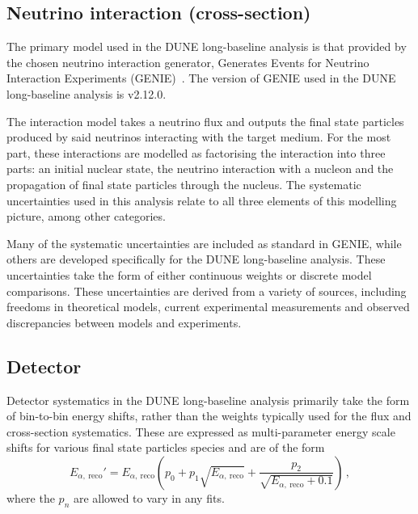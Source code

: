\subsection{Neutrino interaction (cross-section)}
\label{sec:dune_lbl:systs:xsec}

The primary model used in the DUNE long-baseline analysis is that provided by the chosen neutrino interaction generator, Generates Events for Neutrino Interaction Experiments (GENIE)~\cite{genie}.
The version of GENIE used in the DUNE long-baseline analysis is v2.12.0.

The interaction model takes a neutrino flux and outputs the final state particles produced by said neutrinos interacting with the target medium.
For the most part, these interactions are modelled as factorising the interaction into three parts: an initial nuclear state, the neutrino interaction with a nucleon and the propagation of final state particles through the nucleus.
The systematic uncertainties used in this analysis relate to all three elements of this modelling picture, among other categories.

Many of the systematic uncertainties are included as standard in GENIE, while others are developed specifically for the DUNE long-baseline analysis.
These uncertainties take the form of either continuous weights or discrete model comparisons.
These uncertainties are derived from a variety of sources, including freedoms in theoretical models, current experimental measurements and observed discrepancies between models and experiments.

\subsection{Detector}
\label{sec:dune_lbl:systs:det}

Detector systematics in the DUNE long-baseline analysis primarily take the form of bin-to-bin energy shifts, rather than the weights typically used for the flux and cross-section systematics.
These are expressed as multi-parameter energy scale shifts for various final state particles species and are of the form
\begin{equation}
E_{\alpha,~\text{reco}}' = E_{\alpha,~\text{reco}} \left( p_{0} + p_{1} \sqrt{E_{\alpha,~\text{reco}}} + \frac{p_{2}}{\sqrt{E_{\alpha,~\text{reco}}+0.1}} \right) \, ,
\label{eq:energyResponse}	
\end{equation}
where the $p_{n}$ are allowed to vary in any fits.

